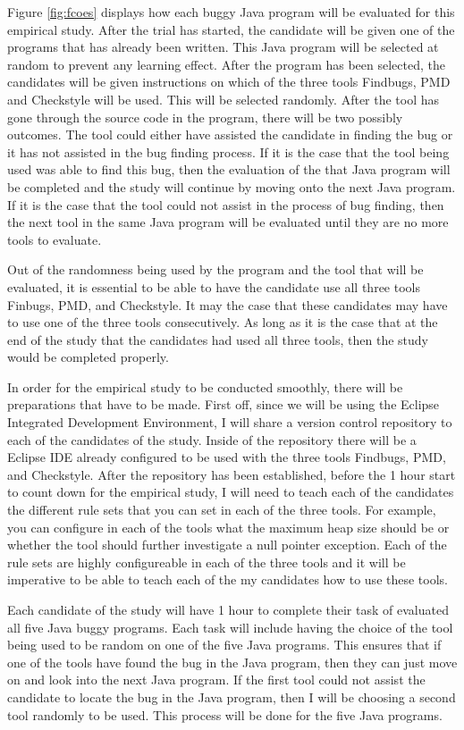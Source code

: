 Figure \ref{fig:fcoes} displays how each buggy Java program will be evaluated for this empirical study. After the trial has started, the candidate will be given one of the programs that has already been written. This Java program will be selected at random to prevent any learning effect. After the program has been selected, the candidates will be given instructions on which of the three tools Findbugs, PMD and Checkstyle will be used. This will be selected randomly. After the tool has gone through the source code in the program, there will be two possibly outcomes. The tool could either have assisted the candidate in finding the bug or it has not assisted in the bug finding process. If it is the case that the tool being used was able to find this bug, then the evaluation of the that Java program will be completed and the study will continue by moving onto the next Java program. If it is the case that the tool could not assist in the process of bug finding, then the next tool in the same Java program will be evaluated until they are no more tools to evaluate.

Out of the randomness being used by the program and the tool that will be evaluated, it is essential to be able to have the candidate use all three tools Finbugs, PMD, and Checkstyle. It may the case that these candidates may have to use one of the three tools consecutively. As long as it is the case that at the end of the study that the candidates had used all three tools, then the study would be completed properly. 

In order for the empirical study to be conducted smoothly, there will be preparations that have to be made. First off, since we will be using the Eclipse Integrated Development Environment, I will share a version control repository to each of the candidates of the study. Inside of the repository there will be a Eclipse IDE already configured to be used with the three tools Findbugs, PMD, and Checkstyle. After the repository has been established, before the 1 hour start to count down for the empirical study, I will need to teach each of the candidates the different rule sets that you can set in each of the three tools. For example, you can configure in each of the tools what the maximum heap size should be or whether the tool should further investigate a null pointer exception. Each of the rule sets are highly configureable in each of the three tools and it will be imperative to be able to teach each of the my candidates how to use these tools. 

Each candidate of the study will have 1 hour to complete their task of evaluated all five Java buggy programs. Each task will include having the choice of the tool being used to be random on one of the five Java programs. This ensures that if one of the tools have found the bug in the Java program, then they can just move on and look into the next Java program. If the first tool could not assist the candidate to locate the bug in the Java program, then I will be choosing a second tool randomly to be used. This process will be done for the five Java programs. 


